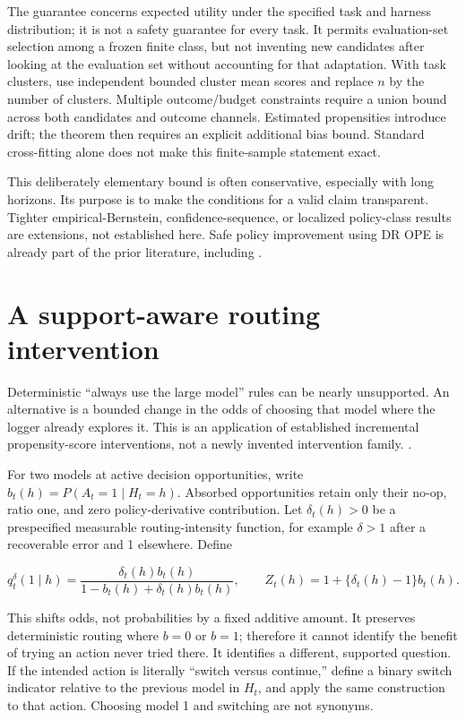 The guarantee concerns expected utility under the specified task and harness distribution; it is not a safety guarantee for every task. It permits evaluation-set selection among a frozen finite class, but not inventing new candidates after looking at the evaluation set without accounting for that adaptation. With task clusters, use independent bounded cluster mean scores and replace \(n\) by the number of clusters. Multiple outcome/budget constraints require a union bound across both candidates and outcome channels. Estimated propensities introduce drift; the theorem then requires an explicit additional bias bound. Standard cross-fitting alone does not make this finite-sample statement exact.

This deliberately elementary bound is often conservative, especially with long horizons. Its purpose is to make the conditions for a valid claim transparent. Tighter empirical-Bernstein, confidence-sequence, or localized policy-class results are extensions, not established here. Safe policy improvement using DR OPE is already part of the prior literature, including \citep{jiang2016dr}.

\section{A support-aware routing intervention}\label{a-support-aware-routing-intervention}

Deterministic ``always use the large model'' rules can be nearly unsupported. An alternative is a bounded change in the odds of choosing that model where the logger already explores it. This is an application of established incremental propensity-score interventions, not a newly invented intervention family. \citep{kennedy2019incremental}.

For two models at active decision opportunities, write \(b_t(h)=P(A_t=1\mid H_t=h)\). Absorbed opportunities retain only their no-op, ratio one, and zero policy-derivative contribution. Let \(\delta_t(h)>0\) be a prespecified measurable routing-intensity function, for example \(\delta>1\) after a recoverable error and 1 elsewhere. Define

\begin{equation}\label{eq:core19}
q_t^{\delta}(1\mid h)
=\frac{\delta_t(h)b_t(h)}{1-b_t(h)+\delta_t(h)b_t(h)},
\qquad
Z_t(h)=1+\{\delta_t(h)-1\}b_t(h).
\end{equation}

This shifts odds, not probabilities by a fixed additive amount. It preserves deterministic routing where \(b=0\) or \(b=1\); therefore it cannot identify the benefit of trying an action never tried there. It identifies a different, supported question. If the intended action is literally ``switch versus continue,'' define a binary switch indicator relative to the previous model in \(H_t\), and apply the same construction to that action. Choosing model 1 and switching are not synonyms.

